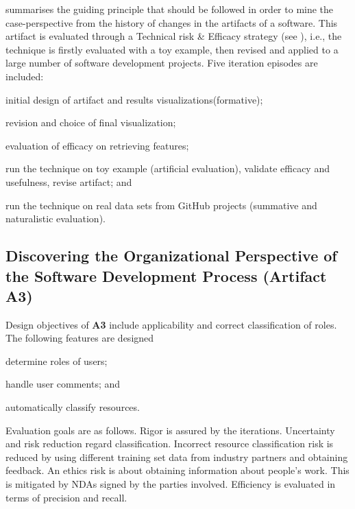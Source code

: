  summarises the guiding principle that should be followed in order to mine the case-perspective from the history of changes in the artifacts of a software. This artifact is evaluated through a Technical risk \& Efficacy strategy (see \cite{Venable2016}), i.e., the technique is firstly evaluated with a toy example, then revised and applied to a large number of software development projects. Five iteration episodes are included: 
\begin{iiilist}
	\item initial design of artifact and results  visualizations(formative);
	\item revision and choice of final visualization;
	\item evaluation of efficacy on retrieving features;
	\item run the technique on toy example (artificial evaluation), validate efficacy and usefulness, revise artifact; and
	\item run the technique on real data sets from GitHub projects (summative and naturalistic evaluation).
\end{iiilist}



\subsection{Discovering the Organizational Perspective of the Software Development Process (Artifact A3)}
Design objectives of \textbf{A3} include applicability and correct classification of roles. The following features are designed 
\begin{iiilist}
	\item determine roles of users;
	\item handle user comments; and
	\item automatically classify resources.
\end{iiilist}
Evaluation goals are as follows. Rigor is assured by the iterations. Uncertainty and risk reduction regard classification. Incorrect resource classification risk is reduced by using different training set data from industry partners and obtaining feedback. An ethics risk is about obtaining information about people's work. This is mitigated by NDAs signed by the parties involved. Efficiency is evaluated in terms of precision and recall. 



